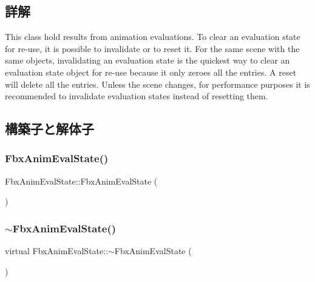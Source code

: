 \subsection{詳解}
This class hold results from animation evaluations. To clear an evaluation state for re-\/use, it is possible to invalidate or to reset it. For the same scene with the same objects, invalidating an evaluation state is the quickest way to clear an evaluation state object for re-\/use because it only zeroes all the entries. A reset will delete all the entries. Unless the scene changes, for performance purposes it is recommended to invalidate evaluation states instead of resetting them. 

\subsection{構築子と解体子}
\mbox{\label{class_fbx_anim_eval_state_a580a41fcddf592e7c4466a26648392c1}} 
\subsubsection{\texorpdfstring{Fbx\+Anim\+Eval\+State()}{FbxAnimEvalState()}}
{\footnotesize\ttfamily Fbx\+Anim\+Eval\+State\+::\+Fbx\+Anim\+Eval\+State (\begin{DoxyParamCaption}{ }\end{DoxyParamCaption})}

\mbox{\label{class_fbx_anim_eval_state_a571cadbab0fda535e1b0a5f650307342}} 
\subsubsection{\texorpdfstring{$\sim$\+Fbx\+Anim\+Eval\+State()}{~FbxAnimEvalState()}}
{\footnotesize\ttfamily virtual Fbx\+Anim\+Eval\+State\+::$\sim$\+Fbx\+Anim\+Eval\+State (\begin{DoxyParamCaption}{ }\end{DoxyParamCaption})\hspace{0.3cm}{\ttfamily [virtual]}}




